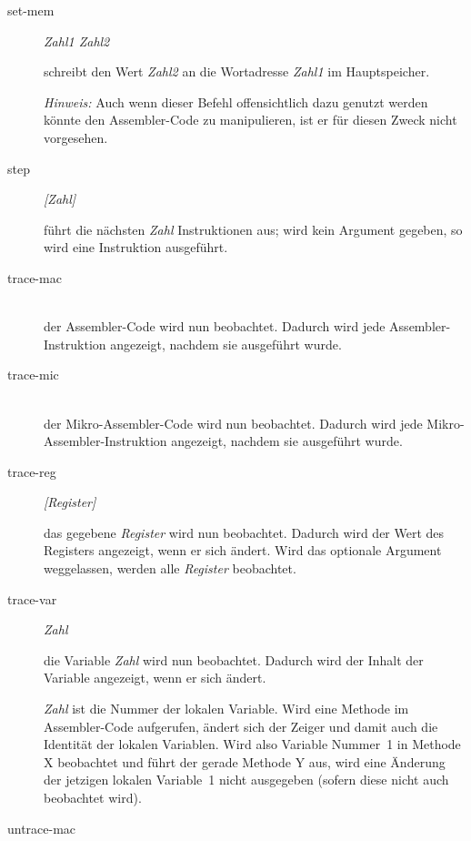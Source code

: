 \begin{description}
\item[set-mem] \emph{Zahl1 Zahl2}

  schreibt den Wert \emph{Zahl2} an die Wortadresse \emph{Zahl1} im Hauptspeicher.

  \emph{Hinweis:} Auch wenn dieser Befehl offensichtlich dazu genutzt werden könnte den Assembler-Code zu manipulieren, ist er für diesen Zweck nicht vorgesehen.

\item[step] \emph{[Zahl]}

  führt die nächsten \emph{Zahl} Instruktionen aus; wird kein Argument gegeben, so wird eine Instruktion ausgeführt.

\item[trace-mac] \hspace*{\fill}\\
  
  der Assembler-Code wird nun beobachtet. Dadurch wird jede Assembler-Instruktion angezeigt, nachdem sie ausgeführt wurde.

\item[trace-mic] \hspace*{\fill}\\

  der Mikro-Assembler-Code wird nun beobachtet. Dadurch wird jede Mikro-Assembler-Instruktion angezeigt, nachdem sie ausgeführt wurde.

\item[trace-reg] \emph{[Register]}

  das gegebene \emph{Register} wird nun beobachtet. Dadurch wird der Wert des Registers angezeigt, wenn er sich ändert. Wird das optionale Argument weggelassen, werden alle \emph{Register} beobachtet.

\item[trace-var] \emph{Zahl}

  die Variable \emph{Zahl} wird nun beobachtet. Dadurch wird der Inhalt der Variable angezeigt, wenn er sich ändert.

  \emph{Zahl} ist die Nummer der lokalen Variable. Wird eine Methode im Assembler-Code aufgerufen, ändert sich der Zeiger  und damit auch die Identität der lokalen Variablen. Wird also Variable Nummer~1 in Methode X beobachtet und führt der \md gerade Methode Y aus, wird eine Änderung der jetzigen lokalen Variable~1 nicht ausgegeben (sofern diese nicht auch beobachtet wird).

\item[untrace-mac] \hspace*{\fill}\\
  

\end{description}
